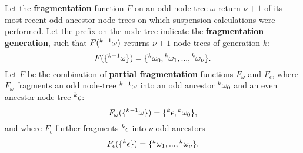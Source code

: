 
\begin{definition}\label{def:fragmentation}
  Let the \textbf{fragmentation} function $F$ on an odd node-tree $\omega$ return $\nu + 1$ of its most recent odd ancestor node-trees on which suspension calculations were performed. Let the prefix on the node-tree indicate the \textbf{fragmentation generation}, such that $F({}^{k-1}\omega)$ returns $\nu + 1$ node-trees of generation $k$:
  \begin{equation}\label{eq:fstep}
    F(\{\pr{k-1}\omega\}) = \{\pr{k}\omega_0,\pr{k}\omega_1,...,\pr{k}\omega_{\nu}\}.
  \end{equation}
  Let $F$ be the combination of \textbf{partial fragmentation} functions $F_\omega$ and $F_\epsilon$, where $F_\omega$ fragments an odd node-tree ${}^{k-1}\omega$ into an odd ancestor ${}^{k}\omega_0$ and an even ancestor node-tree ${}^{k}\epsilon$: 
  \begin{equation}\label{eq:pfo}
    F_\omega(\{\pr{k-1}\omega\}) = \{\pr{k}\epsilon, \pr{k}\omega_0 \},
  \end{equation}
  and where $F_\epsilon$ further fragments ${}^{k}\epsilon$ into $\nu$ odd ancestors
  \begin{equation}\label{eq:pfe}
    F_\epsilon(\{\pr{k}\epsilon\}) =\{\pr{k}\omega_1,...,\pr{k}\omega_{\nu}\}.
  \end{equation}

\end{definition}

